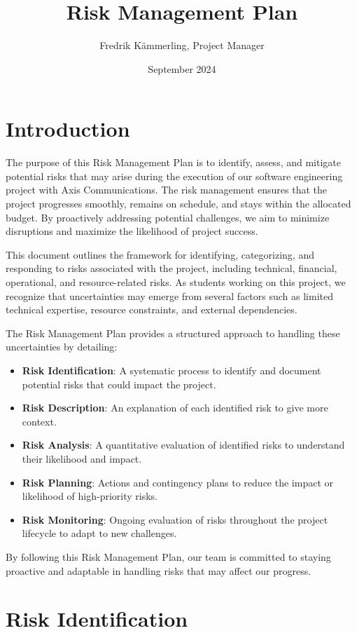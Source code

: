 \documentclass{article}
\title{Risk Management Plan}
\author{Fredrik Kämmerling, Project Manager}
\date{September 2024}
\begin{document}
\maketitle

\section{Introduction}

The purpose of this Risk Management Plan is to identify, assess, and mitigate potential risks that may arise during the execution of our software engineering project with Axis Communications. The risk management ensures that the project progresses smoothly, remains on schedule, and stays within the allocated budget. By proactively addressing potential challenges, we aim to minimize disruptions and maximize the likelihood of project success.

This document outlines the framework for identifying, categorizing, and responding to risks associated with the project, including technical, financial, operational, and resource-related risks. As students working on this project, we recognize that uncertainties may emerge from several factors such as limited technical expertise, resource constraints, and external dependencies.

The Risk Management Plan provides a structured approach to handling these uncertainties by detailing:
\begin{itemize}
    \item \textbf{Risk Identification}: A systematic process to identify and document potential risks that could impact the project.
    \item \textbf{Risk Description}: An explanation of each identified risk to give more context.
    \item \textbf{Risk Analysis}: A quantitative evaluation of identified risks to understand their likelihood and impact.
    \item \textbf{Risk Planning}: Actions and contingency plans to reduce the impact or likelihood of high-priority risks.
    \item \textbf{Risk Monitoring}: Ongoing evaluation of risks throughout the project lifecycle to adapt to new challenges.
\end{itemize}

By following this Risk Management Plan, our team is committed to staying proactive and adaptable in handling risks that may affect our progress.
\pagebreak


\section{Risk Identification}
\end{document}
